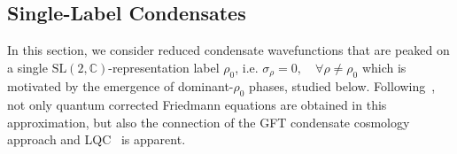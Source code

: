 \documentclass[11pt,a4paper]{article}
\newcommand{\C}{\mathbb C}
\newcommand{\SL}{\text{SL$(2,\C)$}}
\begin{document}
\subsection{Single-Label Condensates}\label{subsec:Single-Label Condensates, Quantum Corrected Friedmann Equations and LQC}

In this section, we consider reduced condensate wavefunctions that are peaked on a single $\SL$-representation label $\rho_0$, i.e. $\sigma_{\rho} = 0,\quad\forall \rho\neq \rho_0$ which is motivated by the emergence of dominant-$\rho_0$ phases, studied below. Following~\cite{Oriti:2016qtz}, not only quantum corrected Friedmann equations are obtained in this approximation, but also the connection of the GFT condensate cosmology approach and LQC~\cite{Bojowald2008,Ashtekar:2021kfp,Banerjee:2011qu} is apparent.
\end{document}
